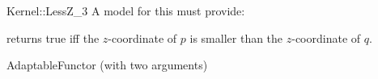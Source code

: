 \begin{ccRefFunctionObjectConcept}{Kernel::LessZ_3}
A model for this must provide:


{returns true iff the $z$-coordinate of $p$ is smaller than the
$z$-coordinate of $q$.}

\ccRefines
AdaptableFunctor (with two arguments)

\ccSeeAlso
{}\\

\end{ccRefFunctionObjectConcept}
